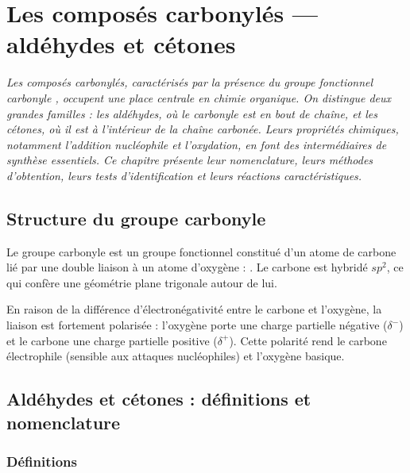 \chapter{Les composés carbonylés — aldéhydes et cétones}

\textit{Les composés carbonylés, caractérisés par la présence du groupe fonctionnel carbonyle , occupent une place centrale en chimie organique. On distingue deux grandes familles : les aldéhydes, où le carbonyle est en bout de chaîne, et les cétones, où il est à l'intérieur de la chaîne carbonée. Leurs propriétés chimiques, notamment l'addition nucléophile et l'oxydation, en font des intermédiaires de synthèse essentiels. Ce chapitre présente leur nomenclature, leurs méthodes d'obtention, leurs tests d'identification et leurs réactions caractéristiques.}

\section{Structure du groupe carbonyle}

\begin{definition}
Le groupe carbonyle est un groupe fonctionnel constitué d'un atome de carbone lié par une double liaison à un atome d'oxygène : . Le carbone est hybridé $sp^2$, ce qui confère une géométrie plane trigonale autour de lui.
\end{definition}

\begin{propriete}
En raison de la différence d'électronégativité entre le carbone et l'oxygène, la liaison  est fortement polarisée : l'oxygène porte une charge partielle négative ($\delta^-$) et le carbone une charge partielle positive ($\delta^+$). Cette polarité rend le carbone électrophile (sensible aux attaques nucléophiles) et l'oxygène basique.
\end{propriete}

\begin{illus}
\end{illus}

\section{Aldéhydes et cétones : définitions et nomenclature}

\subsection{Définitions}


